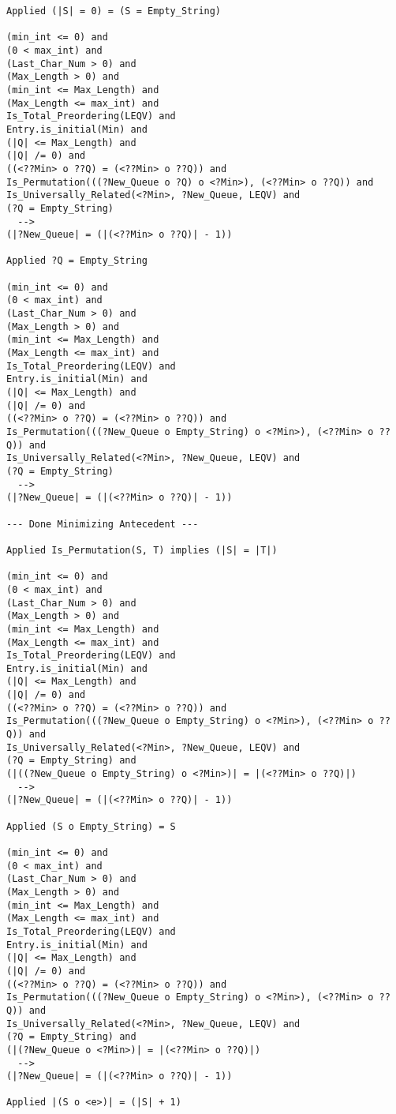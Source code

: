\begin{lstlisting}[language=resolve]
Applied (|S| = 0) = (S = Empty_String)

(min_int <= 0) and
(0 < max_int) and
(Last_Char_Num > 0) and
(Max_Length > 0) and
(min_int <= Max_Length) and
(Max_Length <= max_int) and
Is_Total_Preordering(LEQV) and
Entry.is_initial(Min) and
(|Q| <= Max_Length) and
(|Q| /= 0) and
((<??Min> o ??Q) = (<??Min> o ??Q)) and
Is_Permutation(((?New_Queue o ?Q) o <?Min>), (<??Min> o ??Q)) and
Is_Universally_Related(<?Min>, ?New_Queue, LEQV) and
(?Q = Empty_String)
  -->
(|?New_Queue| = (|(<??Min> o ??Q)| - 1))

Applied ?Q = Empty_String

(min_int <= 0) and
(0 < max_int) and
(Last_Char_Num > 0) and
(Max_Length > 0) and
(min_int <= Max_Length) and
(Max_Length <= max_int) and
Is_Total_Preordering(LEQV) and
Entry.is_initial(Min) and
(|Q| <= Max_Length) and
(|Q| /= 0) and
((<??Min> o ??Q) = (<??Min> o ??Q)) and
Is_Permutation(((?New_Queue o Empty_String) o <?Min>), (<??Min> o ??Q)) and
Is_Universally_Related(<?Min>, ?New_Queue, LEQV) and
(?Q = Empty_String)
  -->
(|?New_Queue| = (|(<??Min> o ??Q)| - 1))

--- Done Minimizing Antecedent ---

Applied Is_Permutation(S, T) implies (|S| = |T|)

(min_int <= 0) and
(0 < max_int) and
(Last_Char_Num > 0) and
(Max_Length > 0) and
(min_int <= Max_Length) and
(Max_Length <= max_int) and
Is_Total_Preordering(LEQV) and
Entry.is_initial(Min) and
(|Q| <= Max_Length) and
(|Q| /= 0) and
((<??Min> o ??Q) = (<??Min> o ??Q)) and
Is_Permutation(((?New_Queue o Empty_String) o <?Min>), (<??Min> o ??Q)) and
Is_Universally_Related(<?Min>, ?New_Queue, LEQV) and
(?Q = Empty_String) and
(|((?New_Queue o Empty_String) o <?Min>)| = |(<??Min> o ??Q)|)
  -->
(|?New_Queue| = (|(<??Min> o ??Q)| - 1))

Applied (S o Empty_String) = S

(min_int <= 0) and
(0 < max_int) and
(Last_Char_Num > 0) and
(Max_Length > 0) and
(min_int <= Max_Length) and
(Max_Length <= max_int) and
Is_Total_Preordering(LEQV) and
Entry.is_initial(Min) and
(|Q| <= Max_Length) and
(|Q| /= 0) and
((<??Min> o ??Q) = (<??Min> o ??Q)) and
Is_Permutation(((?New_Queue o Empty_String) o <?Min>), (<??Min> o ??Q)) and
Is_Universally_Related(<?Min>, ?New_Queue, LEQV) and
(?Q = Empty_String) and
(|(?New_Queue o <?Min>)| = |(<??Min> o ??Q)|)
  -->
(|?New_Queue| = (|(<??Min> o ??Q)| - 1))

Applied |(S o <e>)| = (|S| + 1)


\end{lstlisting}
